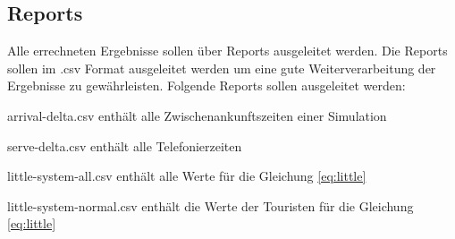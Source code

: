 \subsection{Reports}
Alle errechneten Ergebnisse sollen über Reports ausgeleitet werden. Die Reports sollen im .csv Format ausgeleitet werden um eine gute Weiterverarbeitung der Ergebnisse zu gewährleisten. Folgende Reports sollen ausgeleitet werden:
\begin{list}{•}
	\item arrival-delta.csv enthält alle Zwischenankunftszeiten einer Simulation
	
	\item serve-delta.csv enthält alle Telefonierzeiten
	
	\item little-system-all.csv enthält alle Werte für die Gleichung \ref{eq:little}
    	
    	\item little-system-normal.csv enthält die Werte der Touristen für die Gleichung \ref{eq:little}
    	

\end{list}
